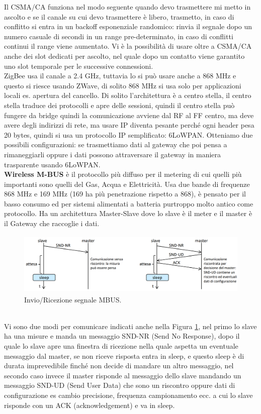 \documentclass[11pt, twocolumn]{article}
\begin{document}
Il CSMA/CA funziona nel modo seguente quando devo trasmettere mi metto in ascolto e se il canale su cui devo trasmettere è libero, trasmetto, in caso di conflitto si entra in un backoff esponenziale randomico: rinvia il segnale dopo un numero casuale di secondi in un range pre-determinato, in caso di conflitti continui il range viene aumentato.
Vi è la possibilità di usare oltre a CSMA/CA anche dei slot dedicati per ascolto, nel quale dopo un contatto viene garantito uno slot temporale per le successive connessioni.\\
ZigBee usa il canale a 2.4 GHz, tuttavia lo si può usare anche a 868 MHz  e questo si riesce usando ZWave, di solito 868 MHz si usa solo per applicazioni locali es. apertura del cancello.
Di solito l'architettura è a centro stella, il centro stella traduce dei protocolli e apre delle sessioni, quindi il centro stella può fungere da bridge quindi la comunicazione avviene dal RF al FF centro, ma deve avere degli indirizzi di rete, ma usare IP diventa pesante perché ogni header pesa 20 bytes, quindi si usa un protocollo IP semplificato: 6LoWPAN.
Otteniamo due possibili configurazioni: se trasmettiamo dati al gateway che poi pensa a rimaneggiarli oppure i dati possono attraversare il gateway in maniera trasparente usando 6LoWPAN.\\
\textbf{Wireless M-BUS} è il protocollo più diffuso per il metering di cui quelli più importanti sono quelli del Gas, Acqua e Elettricità.
Usa due bande di frequenze 868 MHz e 169 MHz (169 ha più penetrazione rispetto a 868), è pensato per il basso consumo ed per sistemi alimentati a batteria purtroppo molto antico come protocollo.
Ha un architettura Master-Slave dove lo slave è il meter e il master è il Gateway che raccoglie i dati.
\begin{figure}[!h]
  \centering
  \includegraphics[width=\linewidth,height=3cm]{imgs/mbus.png}
  \caption{Invio/Ricezione segnale MBUS.}
  \label{fig:mbus}
\end{figure}\\
Vi sono due modi per comunicare indicati anche nella Figura \ref{fig:mbus}, nel primo lo slave ha una misure e manda un messaggio SND-NR (Send No Response), dopo il quale lo slave apre una finestra di ricezione nella quale aspetta un eventuale messaggio dal master, se non riceve risposta entra in sleep, e questo sleep è di durata imprevedibile finché non decide di mandare un altro messaggio, nel secondo caso invece il master risponde al messaggio dello slave mandando un messaggio SND-UD (Send User Data) che sono un riscontro oppure dati di configurazione es cambio precisione, frequenza campionamento ecc. a cui lo slave risponde con un ACK (acknowledgement) e va in sleep.
\end{document}
